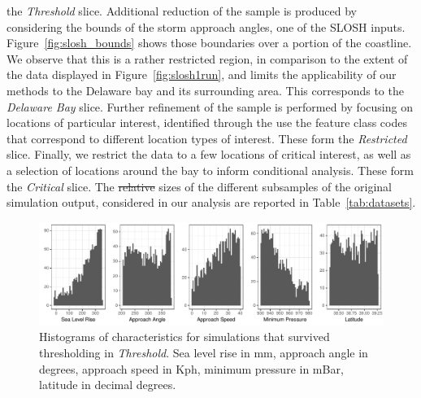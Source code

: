     the \emph{Threshold} slice.  Additional reduction of the sample is produced by
    considering the bounds of the storm approach angles, one of the SLOSH inputs. 
    Figure~\ref{fig:slosh_bounds} shows those boundaries over a portion of 
    the coastline. We observe that this is a rather restricted region, 
    in comparison to the extent of the data displayed in Figure~\ref{fig:slosh1run},
    and limits the applicability of our methods to the Delaware bay and its 
    surrounding area. This corresponds to the \emph{Delaware Bay} slice.  Further 
    refinement of the sample is performed by focusing on locations of particular 
    interest, identified through the use the feature class codes that correspond 
    to different location types of interest.  These form the \emph{Restricted} slice.
    Finally, we restrict the data to a few locations of critical interest, 
    as well as a selection of locations around the bay to inform conditional analysis.  
    These form the \emph{Critical} slice. The \st{relative} sizes of the different 
    subsamples of the original simulation output, considered in our analysis are
    reported in Table~\ref{tab:datasets}.

\begin{figure}[htb]
    \centering 
    \caption{Histograms of characteristics for simulations that survived thresholding in \emph{Threshold}.
        Sea level rise in mm, approach angle in degrees, approach speed in Kph, minimum pressure in mBar,
        latitude in decimal degrees. 
        \label{fig:thetahistogram}}
    \includegraphics[width=0.9\linewidth]{plots/threshold_histogram}
\end{figure}

